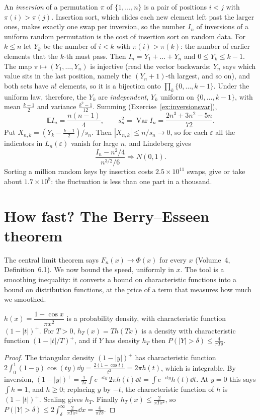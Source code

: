\begin{example}\label{ex:inversions}
An \emph{inversion} of a permutation $\pi$ of $\{1,\dots,n\}$ is a pair of positions $i<j$ with $\pi(i)>\pi(j)$. Insertion sort, which slides each new
element left past the larger ones, makes exactly one swap per inversion, so the number $I_n$ of inversions of a uniform random permutation is the
cost of insertion sort on random data. For $k\le n$ let $Y_k$ be the number of $i<k$ with $\pi(i)>\pi(k)$: the number of earlier elements that the
$k$-th must pass. Then $I_n=Y_1+\dots+Y_n$ and $0\le Y_k\le k-1$. The map $\pi\mapsto(Y_1,\dots,Y_n)$ is injective (read the vector backwards:
$Y_n$ says which value sits in the last position, namely the $(Y_n+1)$-th largest, and so on), and both sets have $n!$ elements, so it is a
bijection onto $\prod_k\{0,\dots,k-1\}$. Under the uniform law, therefore, the $Y_k$ are \emph{independent}, $Y_k$ uniform on $\{0,\dots,k-1\}$, with
mean $\frac{k-1}2$ and variance $\frac{k^2-1}{12}$. Summing (Exercise~\ref{ex:inversionsvar}),
\[
\mathbb EI_n=\frac{n(n-1)}4,\qquad s_n^2=\operatorname{Var}I_n=\frac{2n^3+3n^2-5n}{72}.
\]
Put $X_{n,k}=(Y_k-\frac{k-1}2)/s_n$. Then $|X_{n,k}|\le n/s_n\to0$, so for each $\varepsilon$ all the indicators in $L_n(\varepsilon)$ vanish for
large $n$, and Lindeberg gives
\[
\frac{I_n-n^2/4}{n^{3/2}/6}\Rightarrow N(0,1).
\]
Sorting a million random keys by insertion costs $2.5\times10^{11}$ swaps, give or take about $1.7\times10^8$: the fluctuation is less than one part in a
thousand.
\end{example}

\section{How fast? The Berry--Esseen theorem}

The central limit theorem says $F_n(x)\to\Phi(x)$ for every $x$ (Volume~4, Definition~6.1). We now bound the speed, uniformly in $x$. The tool is a smoothing inequality: it converts a bound on characteristic functions into a bound on distribution functions,
at the price of a term that measures how much we smoothed.

\begin{lemma}\label{lem:polya}
$h(x)=\dfrac{1-\cos x}{\pi x^2}$ is a probability density, with characteristic function $(1-|t|)^+$. For $T>0$, $h_T(x)=Th(Tx)$ is a density
with characteristic function $(1-|t|/T)^+$, and if $Y$ has density $h_T$ then $P(|Y|>\delta)\le\frac4{\pi T\delta}$.
\end{lemma}
\begin{proof}
The triangular density $(1-|y|)^+$ has characteristic function $2\int_0^1(1-y)\cos(ty)\dd y=\frac{2(1-\cos t)}{t^2}=2\pi h(t)$, which is integrable. By
inversion, $(1-|y|)^+=\frac1{2\pi}\int e^{-ity}\,2\pi h(t)\dd t=\int e^{-ity}h(t)\dd t$. At $y=0$ this says $\int h=1$, and $h\ge0$; replacing $y$ by $-t$,
the characteristic function of $h$ is $(1-|t|)^+$. Scaling gives $h_T$. Finally $h_T(x)\le\frac2{\pi Tx^2}$, so
$P(|Y|>\delta)\le2\int_\delta^\infty\frac2{\pi Tx^2}\dd x=\frac4{\pi T\delta}$.
\end{proof}

